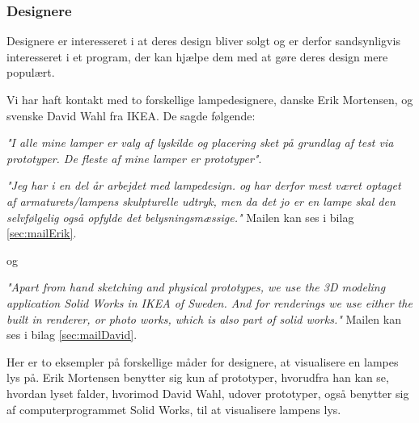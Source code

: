 \subsubsection{Designere}
Designere er interesseret i at deres design bliver solgt og er derfor sandsynligvis interesseret i et program, der kan hjælpe dem med at gøre deres design mere populært.

 
Vi har haft kontakt med to forskellige lampedesignere, danske Erik Mortensen, og svenske David Wahl fra IKEA. De sagde følgende:
\begin{center}
\textit{"I alle mine lamper er valg af lyskilde og placering sket på grundlag af test via prototyper. De fleste af mine lamper er prototyper"}.

\textit{"Jeg har i en del år arbejdet med lampedesign. og har derfor mest været optaget af armaturets/lampens skulpturelle udtryk, men da det jo er en lampe skal den selvfølgelig  også opfylde det belysningsmæssige."} Mailen kan ses i bilag \ref{sec:mailErik}.
\end{center}
og
\begin{center}
\textit{"Apart from hand sketching and physical prototypes, we use the 3D modeling application Solid Works in IKEA of Sweden. And for renderings we use either the built in renderer, or photo works, which is also part of solid works."} Mailen kan ses i bilag \ref{sec:mailDavid}.
\end{center}

Her er to eksempler på forskellige måder for designere, at visualisere en lampes lys på. Erik Mortensen benytter sig kun af prototyper, hvorudfra han kan se, hvordan lyset falder, hvorimod David Wahl, udover prototyper, også benytter sig af computerprogrammet Solid Works, til at visualisere lampens lys. 